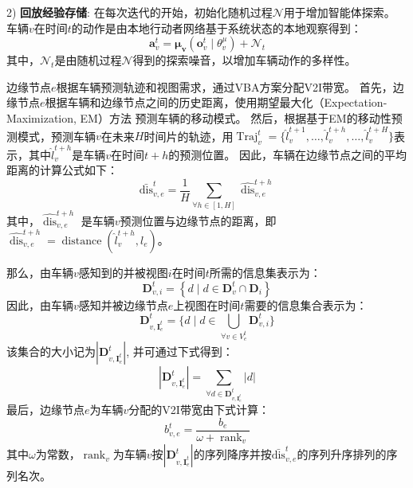 2) \textbf{回放经验存储}:
在每次迭代的开始，初始化随机过程$\mathcal{N}$用于增加智能体探索。
车辆$v$在时间$t$的动作是由本地行动者网络基于系统状态的本地观察得到：
\begin{equation}
	\boldsymbol{a}_{v}^{t}=\boldsymbol{\mu}_{\boldsymbol{v}}\left(\boldsymbol{o}_{v}^{t} \mid \theta_{v}^{\mu}\right)+\mathcal{N}_{t}
\end{equation}
\noindent 其中，$\mathcal{N}_{t}$是由随机过程$\mathcal{N}$得到的探索噪音，以增加车辆动作的多样性。

边缘节点$e$根据车辆预测轨迹和视图需求，通过VBA方案分配V2I带宽。
首先，边缘节点$e$根据车辆和边缘节点之间的历史距离，使用期望最大化（Expectation-Maximization, EM）方法\cite{hofmann2001unsupervised} 预测车辆的移动模式。
然后，根据基于EM的移动性预测模式，预测车辆$v$在未来$H$时间片的轨迹，用$\operatorname{Traj}_{v}^{t} = \{ \hat{l}_{v}^{t+1}, \dots, \hat{l}_{v}^{t+h}, \dots, \hat{l}_{v}^{t+H}\}$表示，其中$\hat{l}_{v}^{t+h}$是车辆$v$在时间$t+h$的预测位置。
因此，车辆在边缘节点之间的平均距离的计算公式如下：
\begin{equation}
	\operatorname{\bar{dis}}_{v, e}^{t} = \frac{1}{H} {\sum_{\forall h \in [1, H]} \widehat{\operatorname{dis}}_{v, e}^{t+h}}
\end{equation}
其中，$\widehat{\operatorname{dis}}_{v, e}^{t+h}$ 是车辆$v$预测位置与边缘节点的距离，即$\widehat{\operatorname{dis}}_{v, e}^{t+h}=\operatorname{distance}(\hat{l}_{v}^{t+h}, l_{e})$。

那么，由车辆$v$感知到的并被视图$i$在时间$t$所需的信息集表示为：
\begin{equation}
	\mathbf{D}_{v, i}^{t} = \left\{ d \mid  d \in \mathbf{D}_{v}^t \cap  \mathbf{D}_i \right\}
\end{equation}
因此，由车辆$v$感知并被边缘节点$e$上视图在时间$t$需要的信息集合表示为：
\begin{equation}
	\mathbf{D}_{v, {\mathbf{I}_e^t}}^{t} = \{ d \mid  d \in \bigcup_{\forall v \in V_e^t} \mathbf{D}_{v, i}^{t}\}
\end{equation}
\noindent 该集合的大小记为$|\mathbf{D}_{v, {\mathbf{I}_e^t}}^{t}|$, 并可通过下式得到：
\begin{equation}
	|\mathbf{D}_{v, {\mathbf{I}_e^t}}^{t}| = \sum_{\forall d \in \mathbf{D}_{v, {\mathbf{I}_e^t}}^{t}}|d|
\end{equation}
最后，边缘节点$e$为车辆$v$分配的V2I带宽由下式计算：
\begin{equation}
	b_{v, e}^{t} =\frac{b_{e}} {\omega+\operatorname{rank}_{v}}
\end{equation}
\noindent 其中$\omega$为常数，$\operatorname{rank}_{v}$为车辆$v$按$| \mathbf{D}_{v, {\mathbf{I}_e^t}}^{t}|$的序列降序并按$\operatorname{\bar{dis}}_{v, e}^{t}$的序列升序排列的序列名次。

